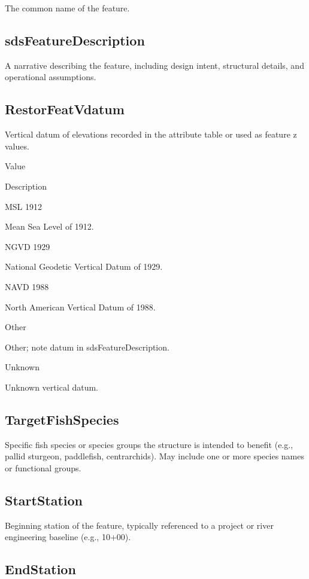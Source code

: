 \documentclass[
  letterpaper,
  DIV=11,
  numbers=noendperiod]{scrreprt}
\begin{document}
The common name of the feature.

\subsection{sdsFeatureDescription}\label{sdsfeaturedescription-3}

A narrative describing the feature, including design intent, structural
details, and operational assumptions.

\subsection{RestorFeatVdatum}\label{restorfeatvdatum-3}

Vertical datum of elevations recorded in the attribute table or used as
feature z values.

Value

Description

MSL 1912

Mean Sea Level of 1912.

NGVD 1929

National Geodetic Vertical Datum of 1929.

NAVD 1988

North American Vertical Datum of 1988.

Other

Other; note datum in sdsFeatureDescription.

Unknown

Unknown vertical datum.

\subsection{TargetFishSpecies}\label{targetfishspecies}

Specific fish species or species groups the structure is intended to
benefit (e.g., pallid sturgeon, paddlefish, centrarchids). May include
one or more species names or functional groups.

\subsection{StartStation}\label{startstation}

Beginning station of the feature, typically referenced to a project or
river engineering baseline (e.g., 10+00).

\subsection{EndStation}\label{endstation}
\end{document}

